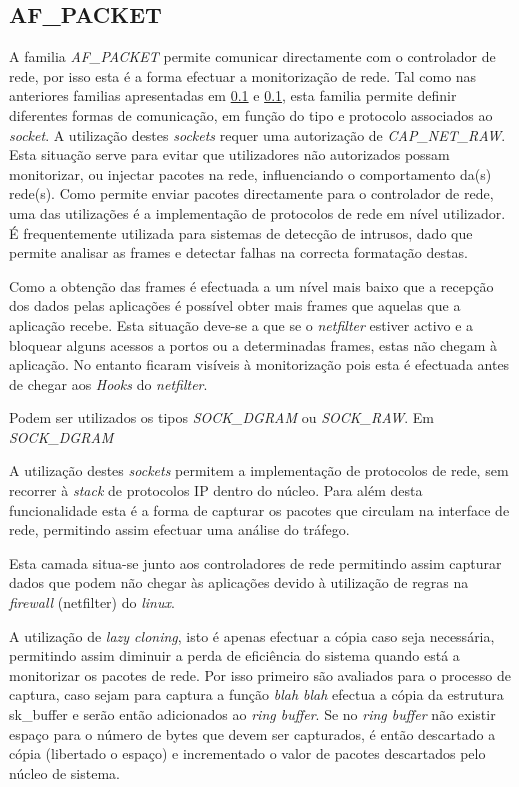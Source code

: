 \subsection{AF\_PACKET}

A familia \textit{AF\_PACKET} permite comunicar directamente com o controlador de rede, por isso esta é a forma efectuar a monitorização de rede. 
 Tal como nas anteriores familias apresentadas em \ref{} e \ref{}, esta familia permite definir diferentes formas de comunicação, em função do tipo e protocolo associados ao \textit{socket}.
 A utilização destes \textit{sockets} requer uma autorização de \textit{CAP\_NET\_RAW}.
 Esta situação serve para evitar que utilizadores não autorizados possam monitorizar, ou injectar pacotes na rede, influenciando o comportamento da(s) rede(s).
 Como permite enviar pacotes directamente para o controlador de rede, uma das utilizações é a implementação de protocolos de rede em nível utilizador.
 É frequentemente utilizada para sistemas de detecção de intrusos, dado que permite analisar as frames e detectar falhas na correcta formatação destas.

 Como a obtenção das frames é efectuada a um nível mais baixo que a recepção dos dados pelas aplicações é possível obter mais frames que aquelas que a aplicação recebe. 
 Esta situação deve-se a que se o \textit{netfilter} estiver activo e a bloquear alguns acessos a portos ou a determinadas frames, estas não chegam à aplicação.
 No entanto ficaram visíveis à monitorização pois esta é efectuada antes de chegar aos \textit{Hooks} do \textit{netfilter}.
 

 Podem ser utilizados os tipos \textit{SOCK\_DGRAM} ou \textit{SOCK\_RAW}. Em \textit{SOCK\_DGRAM}
 

 A utilização destes \textit{sockets} permitem a implementação de protocolos de rede, sem recorrer à \textit{stack} de protocolos IP dentro do núcleo.
 Para além desta funcionalidade esta é a forma de capturar os pacotes que circulam na interface de rede, permitindo assim efectuar uma análise do tráfego.

 Esta camada situa-se junto aos controladores de rede permitindo assim capturar dados que podem não chegar às aplicações devido à utilização de regras na \textit{firewall} (netfilter) do \textit{linux}.

 A utilização de \textit{lazy cloning}, isto é apenas efectuar a cópia caso seja necessária, permitindo assim diminuir a perda de eficiência do sistema quando está a monitorizar os pacotes de rede.
 Por isso primeiro são avaliados para o processo de captura, caso sejam para captura a função \textit{blah blah} efectua a cópia da estrutura sk\_buffer e serão então adicionados ao \textit{ring buffer}.
 Se no \textit{ring buffer} não existir espaço para o número de bytes que devem ser capturados, é então descartado a cópia (libertado o espaço) e incrementado o valor de pacotes descartados pelo núcleo de sistema.


